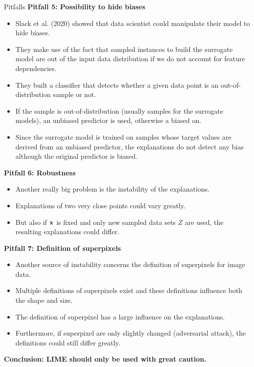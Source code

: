 \documentclass[11pt,compress,t,notes=noshow, xcolor=table]{beamer}
\begin{document}
\begin{vbframe}{Pitfalls}
\textbf{Pitfall 5: Possibility to hide biases}
\begin{itemize}
	\item Slack et al. (2020) showed that data scientist could manipulate their model to hide biases. 
	\item They make use of the fact that sampled instances to build the surrogate model are out of the input data distribution if we do not account for feature dependencies. 
	\item They built a classifier that detects whether a given data point is an out-of-distribution sample or not. 
	\item If the sample is out-of-distribution (usually samples for the surrogate models), an unbiased predictor is used, otherwise a biased on. 
	\item Since the surrogate model is trained on samples whose target values are derived from an unbiased predictor, the explanations do not detect any bias although the original predictor is biased. 
\end{itemize}

\textbf{Pitfall 6: Robustness}
\begin{itemize}
	\item Another really big problem is the instability of the explanations. 
	\item Explanations of two very close points could vary greatly. 
	\item But also if $\xv$ is fixed and only new sampled data sets $Z$ are used, the resulting explanations could differ.  
\end{itemize}

\textbf{Pitfall 7: Definition of superpixels}
\begin{itemize}
	\item Another source of instability concerns the definition of superpixels for image data. 
	\item Multiple definitions of superpixels exist and these definitions influence both the shape and size. 
	\item The definition of superpixel has a large influence on the explanations. 
	\item Furthermore, if superpixel are only slightly changed (adversarial attack), the definitions could still differ greatly.  
\end{itemize}
\vspace{0.5cm}
\textbf{Conclusion: LIME should only be used with great caution.}

\end{vbframe}
\end{document}
